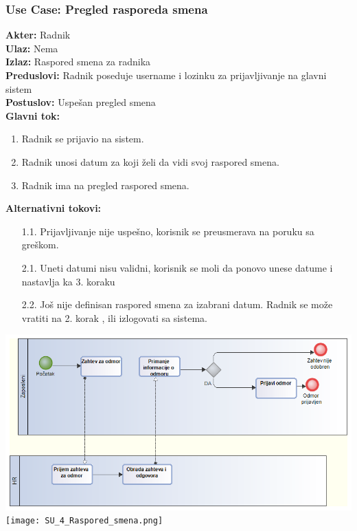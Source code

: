 \documentclass{article}
\begin{document}
\subsubsection{\textbf{Use Case}: Pregled rasporeda smena}
\textbf{Akter:} Radnik\\
\textbf{Ulaz:} Nema\\
\textbf{Izlaz:} Raspored smena za radnika\\
\textbf{Preduslovi:} Radnik poseduje username i lozinku za prijavljivanje na glavni sistem\\
\textbf{Postuslov:} Uspešan pregled smena\\
\textbf{Glavni tok:}
\begin{enumerate}
\item Radnik se prijavio na sistem.
\item Radnik unosi datum za koji želi da vidi svoj raspored smena.
\item Radnik ima na pregled raspored smena.
\end{enumerate}
\textbf{Alternativni tokovi:}\\
\begin{itemize}
\item [1.1.] Prijavljivanje nije uspešno, korisnik se preusmerava na poruku sa greškom.
\item [2.1.] Uneti datumi nisu validni, korisnik se moli da ponovo unese datume i nastavlja ka 3. koraku
\item[2.2.] Još nije definisan raspored smena za izabrani datum. Radnik se može vratiti na 2. korak , ili izlogovati sa sistema.
\end{itemize}

\includegraphics[width=\textwidth]{SU_4_Odmor.png}\\
\texttt{[image: SU\_4\_Raspored\_smena.png]}\\

\end{document}
